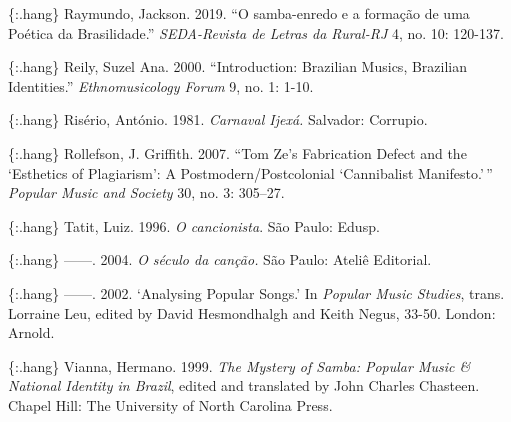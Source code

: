 \documentclass[twoside]{article}
\begin{document}
\{:.hang\} Raymundo, Jackson. 2019. ``O samba-enredo e a formação de uma
Poética da Brasilidade.'' \emph{SEDA-Revista de Letras da Rural-RJ} 4,
no. 10: 120-137.

\{:.hang\} Reily, Suzel Ana. 2000. ``Introduction: Brazilian Musics,
Brazilian Identities.'' \emph{Ethnomusicology Forum} 9, no. 1: 1-10.

\{:.hang\} Risério, António. 1981. \emph{Carnaval Ijexá.} Salvador:
Corrupio.

\{:.hang\} Rollefson, J. Griffith. 2007. ``Tom Ze's Fabrication Defect
and the `Esthetics of Plagiarism': A Postmodern/Postcolonial
`Cannibalist Manifesto.'\,'' \emph{Popular Music and Society} 30, no. 3:
305--27.

\{:.hang\} Tatit, Luiz. 1996. \emph{O cancionista}. São Paulo: Edusp.

\{:.hang\} ­­­------. 2004. \emph{O século da canção.} São Paulo: Ateliê
Editorial.

\{:.hang\} ­­­------. 2002. `Analysing Popular Songs.' In \emph{Popular
Music Studies}, trans. Lorraine Leu, edited by David Hesmondhalgh and
Keith Negus, 33-50. London: Arnold.

\{:.hang\} Vianna, Hermano. 1999. \emph{The Mystery of Samba: Popular
Music \& National Identity in Brazil}, edited and translated by John
Charles Chasteen. Chapel Hill: The University of North Carolina Press.
\end{document}
